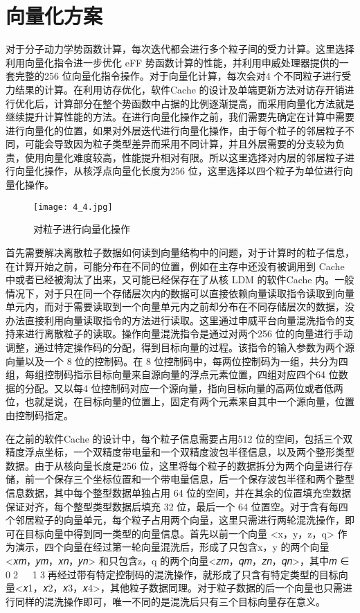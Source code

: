 \section{向量化方案}
对于分子动力学势函数计算，每次迭代都会进行多个粒子间的受力计算。这里选择利用向量化指令进一步优化 eFF 势函数计算的性能，并利用申威处理器提供的一套完整的256 位向量化指令操作。对于向量化计算，每次会对4 个不同粒子进行受力结果的计算。在利用访存优化，软件Cache 的设计及单端更新方法对访存开销进行优化后，计算部分在整个势函数中占据的比例逐渐提高，而采用向量化方法就是继续提升计算性能的方法。在进行向量化操作之前，我们需要先确定在计算中需要进行向量化的位置，如果对外层迭代进行向量化操作，由于每个粒子的邻居粒子不同，可能会导致因为粒子类型差异而采用不同计算，并且外层需要的分支较为负责，使用向量化难度较高，性能提升相对有限。所以这里选择对内层的邻居粒子进行向量化操作，从核浮点向量化长度为256 位，这里选择以四个粒子为单位进行向量化操作。

 \begin{figure}[h]
  \centering
  \texttt{[image: 4\_4.jpg]}
  \caption{对粒子进行向量化操作}
\end{figure}

首先需要解决离散粒子数据如何读到向量结构中的问题，对于计算时的粒子信息，在计算开始之前，可能分布在不同的位置，例如在主存中还没有被调用到 Cache 中或者已经被淘汰了出来，又可能已经保存在了从核 LDM 的软件Cache 内。一般情况下，对于只在同一个存储层次内的数据可以直接依赖向量读取指令读取到向量单元内，而对于需要读取到一个向量单元内之前却分布在不同存储层次的数据，没办法直接利用向量读取指令的方法进行读取。这里通过申威平台向量混洗指令的支持来进行离散粒子的读取。操作向量混洗指令是通过对两个256 位的向量进行手动调整，通过特定操作码的分配，得到目标向量的过程。该指令的输入参数为两个源向量以及一个 8 位的控制码。在 8 位控制码中，每两位控制码为一组，共分为四组，每组控制码指示目标向量来自源向量的浮点元素位置，四组对应四个64 位数据的分配。又以每4 位控制码对应一个源向量，指向目标向量的高两位或者低两位，也就是说，在目标向量的位置上，固定有两个元素来自其中一个源向量，位置由控制码指定。

在之前的软件Cache 的设计中，每个粒子信息需要占用512 位的空间，包括三个双精度浮点坐标，一个双精度带电量和一个双精度波包半径信息，以及两个整形类型数据。由于从核向量长度是256 位，这里将每个粒子的数据拆分为两个向量进行存储，前一个保存三个坐标位置和一个带电量信息，后一个保存波包半径和两个整型信息数据，其中每个整型数据单独占用 64 位的空间，并在其余的位置填充空数据保证对齐，每个整型类型数据后填充 32 位，最后一个 64 位置空。对于含有每四个邻居粒子的向量单元，每个粒子占用两个向量，这里只需进行两轮混洗操作，即可在目标向量中得到同一类型的向量信息。首先以前一个向量 <x，y，z，q> 作为演示，四个向量在经过第一轮向量混洗后，形成了只包含x，y 的两个向量<𝑥𝑚，𝑦𝑚，𝑥𝑛，𝑦𝑛> 和只包含z，q 的两个向量<𝑧𝑚，𝑞𝑚，𝑧𝑛，𝑞𝑛>，其中𝑚 ∈ 0􀀁2􀀁𝑛 ∈ 1􀀁3，再经过带有特定控制码的混洗操作，就形成了只含有特定类型的目标向量<𝑥1，𝑥2，𝑥3，𝑥4>，其他粒子数据同理。对于粒子数据的后一个向量也只需进行同样的混洗操作即可，唯一不同的是混洗后只有三个目标向量存在意义。

